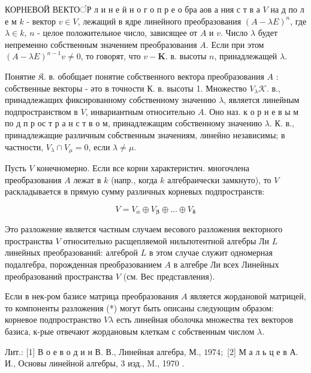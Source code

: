 \documentclass[10pt]{article}
\begin{document}
КОРНЕВОЙ ВЕКТОंР л и н е й н о г о п р е о бра аов а ния с т в а $V$ на д по л е м $k$ - вектор $v \in V$, лежащий в ядре линейного преобразования $(A-\lambda E)^{n}$, где $\lambda \in k$, $n$ - целое положительное число, зависящее от $A$ и $v$. Число $\lambda$ будет непременно собственным значением преобразования $A$. Если при этом $(A-\lambda E)^{n-1} v \neq 0$, то говорят, что $v-\boldsymbol{K}$. в. высоты $n$, принадлежащей $\lambda$.



Понятие $\mathfrak{K}$. в. обобщает понятие собственного вектора преобразования $A$ : собственные векторы - әто в точности К. в. высоты 1. Множество $V_{\lambda} \mathcal{K}$. в., принадлежащих фиксированному собственному значению $\lambda$, является линейным подпространством в $V$, инвариантным относительно $A$. Оно наз. к о р н е в ы м по д п р ос т р а н с т в о м, принадлежащим собственному значению $\lambda$. К. в., принадлежащие различным собственным значениям, линейно независимы; в частности, $V_{\lambda} \cap V_{\mu}=0$, если $\lambda \neq \mu$.



Пусть $V$ конечномерно. Если все корни характеристич. многочлена преобразования $A$ лежат в $k$ (напр., когда $k$ алгебраически замкнуто), то $V$ раскладывается в прямую сумму различных корневых подпространств:



\[

V=V_{\alpha} \oplus V_{\boldsymbol{\beta}} \oplus \ldots \oplus V_{\boldsymbol{\delta}}

\]



Это разложение является частным случаем весового разложения векторного пространства $V$ относительно расщепляемой нильпотентной алгебры Ли $L$ линейных преобразований: алгеброй $L$ в этом случае служит одномерная подалгебра, порожденная преобразованием $A$ в алгебре Ли всех Линейных преобразований пространства $V$ (см. Вес представления).



Если в нек-ром базисе матрица преобразования $A$ является жордановой матрицей, то компоненты разложения (*) могут быть описаны следующим образом: корневое подпространство $V \lambda$ есть линейная оболочка множества тех векторов базиса, к-рые отвечают жордановым клеткам с собственным числом $\lambda$.



Лит.: [1] В о е в о д и н В. В., Линейная алгебра, М., $1974 ;$ [2] М а л ь ц е в А. И., Основы линейной алгебры, 3 изд., M., 1970 .
\end{document}
